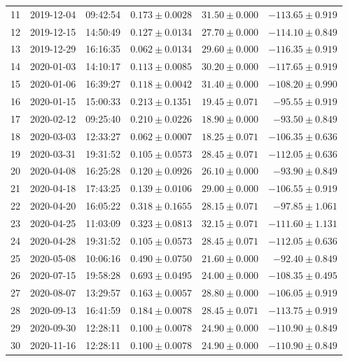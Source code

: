 \documentclass[times,twocolumn,final,authoryear]{elsarticle}
\begin{document}
\begin{table}
\begin{tabular}{|r|r|r|r|r|r|}
11 & 2019-12-04 & 09:42:54 & $0.173\pm 0.0028$ & $31.50 \pm 0.000$ & $-113.65 \pm  0.919$\\
12 & 2019-12-15 & 14:50:49 & $0.127\pm 0.0134$ & $27.70 \pm 0.000$ & $-114.10 \pm  0.849$\\
13 & 2019-12-29 & 16:16:35 & $0.062\pm 0.0134$ & $29.60 \pm 0.000$ & $-116.35 \pm  0.919$\\
14 & 2020-01-03 & 14:10:17 & $0.113\pm 0.0085$ & $30.20 \pm 0.000$ & $-117.65 \pm  0.919$\\
15 & 2020-01-06 & 16:39:27 & $0.118\pm 0.0042$ & $31.40 \pm 0.000$ & $-108.20 \pm  0.990$\\
16 & 2020-01-15 & 15:00:33 & $0.213\pm 0.1351$ & $19.45 \pm 0.071$ & $-95.55 \pm   0.919$\\
17 & 2020-02-12 & 09:25:40 & $0.210\pm 0.0226$ & $18.90 \pm 0.000$ & $-93.50 \pm   0.849$\\
18 & 2020-03-03 & 12:33:27 & $0.062\pm 0.0007$ & $18.25 \pm 0.071$ & $-106.35 \pm 0.636$\\
19 & 2020-03-31 & 19:31:52 & $0.105\pm 0.0573$ & $28.45 \pm 0.071$ & $-112.05 \pm  0.636$\\
20 & 2020-04-08 & 16:25:28 & $0.120\pm 0.0926$ & $26.10 \pm 0.000$ & $-93.90 \pm   0.849$\\
21 & 2020-04-18 & 17:43:25 & $0.139\pm 0.0106$ & $29.00 \pm 0.000$ & $-106.55 \pm  0.919$\\
22 & 2020-04-20 & 16:05:22 & $0.318\pm 0.1655$ & $28.15 \pm 0.071$ & $-97.85 \pm   1.061$\\
23 & 2020-04-25 & 11:03:09 & $0.323\pm 0.0813$ & $32.15 \pm 0.071$ & $-111.60 \pm  1.131$\\
24 & 2020-04-28 & 19:31:52 & $0.105\pm 0.0573$ & $28.45 \pm 0.071$ & $-112.05 \pm  0.636$\\
25 & 2020-05-08 & 10:06:16 & $0.490\pm 0.0750$ & $21.60 \pm 0.000$ & $-92.40 \pm   0.849$\\
26 & 2020-07-15 & 19:58:28 & $0.693\pm 0.0495$ & $24.00 \pm 0.000$ & $-108.35 \pm  0.495$\\
27 & 2020-08-07 & 13:29:57 & $0.163\pm 0.0057$ & $28.80 \pm 0.000$ & $-106.05 \pm  0.919$\\
28 & 2020-09-13 & 16:41:59 & $0.184\pm 0.0078$ & $28.45 \pm 0.071$ & $-113.75 \pm  0.919$\\
29 & 2020-09-30 & 12:28:11 & $0.100\pm 0.0078$ & $24.90 \pm 0.000$ & $-110.90 \pm  0.849$\\
30 & 2020-11-16 & 12:28:11 & $0.100\pm 0.0078$ & $24.90 \pm 0.000$ & $-110.90 \pm  0.849$\\

\end{tabular}
\end{table}
\end{document}
